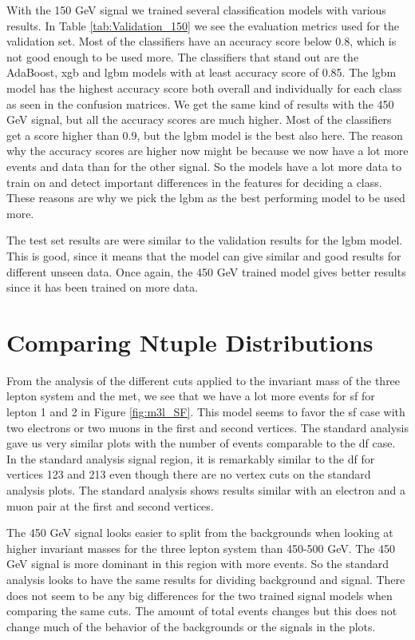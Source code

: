 \documentclass[a4paper, american, 12pt]{report}
\begin{document}
	With the 150 GeV signal we trained several classification models with various results. In Table \ref{tab:Validation_150} we see the evaluation metrics used for the validation set. Most of the classifiers have an accuracy score below 0.8, which is not good enough to be used more. The classifiers that stand out are the AdaBoost, \acrshort{xgb} and \acrshort{lgbm} models with at least accuracy score of 0.85. The \acrshort{lgbm} model has the highest accuracy score both overall and individually for each class as seen in the confusion matrices. We get the same kind of results with the 450 GeV signal, but all the accuracy scores are much higher. Most of the classifiers get a score higher than 0.9, but the \acrshort{lgbm} model is the best also here. The reason why the accuracy scores are higher now might be because we now have a lot more events and data than for the other signal. So the models have a lot more data to train on and detect important differences in the features for deciding a class. These reasons are why we pick the \acrshort{lgbm} as the best performing model to be used more.

	The test set results are were similar to the validation results for the \acrshort{lgbm} model. This is good, since it means that the model can give similar and good results for different unseen data. Once again, the 450 GeV trained model gives better results since it has been trained on more data.

	
	\section{Comparing Ntuple Distributions}
	\label{sect:Discussion-CompNtuples}
	From the analysis of the different cuts applied to the invariant mass of the three lepton system and the \acrshort{met}, we see that we have a lot more events for \acrshort{sf} for lepton 1 and 2 in Figure \ref{fig:m3l_SF}. This model seems to favor the \acrshort{sf} case with two electrons or two muons in the first and second vertices. The standard analysis gave us very similar plots with the number of events comparable to the \acrshort{df} case. In the standard analysis signal region, it is remarkably similar to the \acrshort{df} for vertices 123 and 213 even though there are no vertex cuts on the standard analysis plots. The standard analysis shows results similar with an electron and a muon pair at the first and second vertices. 
	
	The 450 GeV signal looks easier to split from the backgrounds when looking at higher invariant masses for the three lepton system than 450-500 GeV. The 450 GeV signal is more dominant in this region with more events. So the standard analysis looks to have the same results for dividing background and signal. There does not seem to be any big differences for the two trained signal models when comparing the same cuts. The amount of total events changes but this does not change much of the behavior of the backgrounds or the signals in the plots.
	
\end{document}
